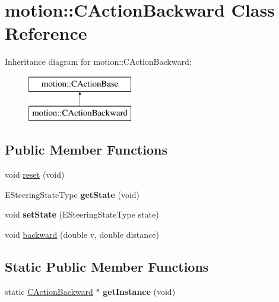 \hypertarget{classmotion_1_1CActionBackward}{}\section{motion\+:\+:C\+Action\+Backward Class Reference}
\label{classmotion_1_1CActionBackward}
Inheritance diagram for motion\+:\+:C\+Action\+Backward\+:\begin{figure}[H]
\begin{center}
\leavevmode
\includegraphics[height=2.000000cm]{classmotion_1_1CActionBackward}
\end{center}
\end{figure}
\subsection*{Public Member Functions}
\begin{DoxyCompactItemize}
\item 
void \mbox{\hyperlink{classmotion_1_1CActionBackward_a609f364c24b4ceebda81c0b591692d2a}{reset}} (void)
\item 
\mbox{\label{classmotion_1_1CActionBackward_a4afcf9dbebf653ac200dead6912ce9e3}} 
E\+Steering\+State\+Type {\bfseries get\+State} (void)
\item 
\mbox{\label{classmotion_1_1CActionBackward_a8cf85f6123f690a0e3a7edc5f49990d1}} 
void {\bfseries set\+State} (E\+Steering\+State\+Type state)
\item 
void \mbox{\hyperlink{classmotion_1_1CActionBackward_ab05c93abef4815a4a9f38afeddbb8c2a}{backward}} (double v, double distance)
\end{DoxyCompactItemize}
\subsection*{Static Public Member Functions}
\begin{DoxyCompactItemize}
\item 
\mbox{\label{classmotion_1_1CActionBackward_aa1b0a2ac1a8f390bc88b36607137b5f1}} 
static \mbox{\hyperlink{classmotion_1_1CActionBackward}{C\+Action\+Backward}} $\ast$ {\bfseries get\+Instance} (void)
\end{DoxyCompactItemize}


